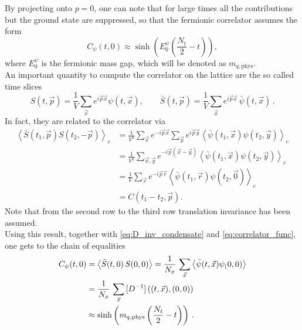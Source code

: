 By projecting onto $p=0$, one can note that for large times all the contributions but the ground state are suppressed, so that 
the fermionic correlator assumes the form 
\begin{equation}
    C_\psi(t,0) \approx \sinh \left(E_0^{\psi} \left(\frac{N_t}{2} - t\right)\right),
    \label{eq:correlator_func}
\end{equation}
where $E_0^{\psi}$ is the fermionic mass gap, which will be denoted as $m_{q,\text{phys}}$. \\
An important quantity to compute the correlator on the lattice are the so called time slices
\begin{equation*} 
    S(t, \vec{p})=\frac{1}{V} \sum_{\vec{x}} e^{i \vec{p} \vec{x}} \psi(t, \vec{x}), \qquad \bar{S}(t, \vec{p})=\frac{1}{V} \sum_{\vec{x}} e^{i \vec{p} \vec{x}} \, \bar\psi(t, \vec{x}) \, .
\end{equation*}
In fact, they are related to the correlator via
\begin{equation*}
    \begin{aligned}
        \left\langle \bar{S}\left(t_1, \vec{p}\right) S\left(t_2,-\vec{p}\right)\right\rangle_c & =\frac{1}{V^2} \sum_{\vec{x}} e^{-i \vec{p} \vec{x}} \sum_{\vec{y}} e^{i \vec{p} \vec{y}}\left\langle\bar\psi\left(t_1, \vec{x}\right) \psi\left(t_2, \vec{y}\right)\right\rangle_c \\
        & =\frac{1}{V^2} \sum_{\vec{x}, \vec{y}} e^{-i \vec{p}(\vec{x}-\vec{y})}\left\langle\bar\psi\left(t_1, \vec{x}\right) \psi\left(t_2, \vec{y}\right)\right\rangle_c \\
        & =\frac{1}{V} \sum_{\vec{r}} e^{-i \vec{p} \vec{r}}\left\langle\bar\psi\left(t_1, \vec{r}\right) \psi\left(t_2, \vec{0}\right)\right\rangle_c \\
        & =C\left(t_1-t_2, \vec{p}\right) .
        \end{aligned}
\end{equation*}
Note that from the second row to the third row translation invariance has been assumed. \\
Using this result, together with \eqref{eq:D_inv_condensate} and \eqref{eq:correlator_func}, one gets to the chain of equalities
\begin{equation*}
    \begin{aligned}
        C_\psi(t, 0)  &= \left\langle \bar{S}(t,0) \, S(0,0) \right\rangle = \frac{1}{N_x} \,  \sum_{\vec{x}} \left\langle \bar\psi(t,\vec{x}) \psi_(0,0) \right\rangle \\
        &= \frac{1}{N_x} \, \sum_{\vec{x}} \, [D^{-1}] \left((t,\vec{x}),(0,0)\right) \\
        &\approx \sinh\left(m_{q, \text{phys}}\left(\frac{N_t}{2} - t\right)\right) \, .
    \end{aligned}
\end{equation*}
